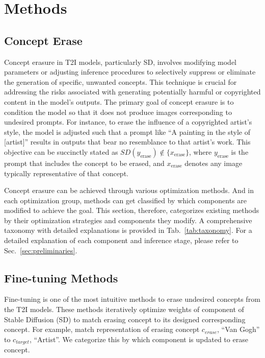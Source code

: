 \section{Methods} \label{sec:method}

\subsection{Concept Erase}
Concept erasure in T2I models, particularly SD, involves modifying model parameters or adjusting inference procedures to selectively suppress or eliminate the generation of specific, unwanted concepts. This technique is crucial for addressing the risks associated with generating potentially harmful or copyrighted content in the model's outputs. The primary goal of concept erasure is to condition the model so that it does not produce images corresponding to undesired prompts. For instance, to erase the influence of a copyrighted artist's style, the model is adjusted such that a prompt like ``A painting in the style of [artist]'' results in outputs that bear no resemblance to that artist's work. This objective can be succinctly stated as \(SD(y_{\text{erase}}) \not\in  \{ x_{\text{erase}}\}\), where \(y_{\text{erase}}\) is the prompt that includes the concept to be erased, and \(x_{\text{erase}}\) denotes any image typically representative of that concept.



Concept erasure can be achieved through various optimization methods. And in each optimization group, methods can get classified by which components are modified to achieve the goal. This section,  therefore, categorizes existing methods by their optimization strategies and components they modify.
A comprehensive taxonomy with detailed explanations is provided in Tab.~\ref{tab:taxonomy}.
For a detailed explanation of each component and inference stage, please refer to Sec.~\ref{sec:preliminaries}.


\subsection{Fine-tuning Methods} \label{subsec:finetuning}
Fine-tuning is one of the most intuitive methods to erase undesired concepts from the T2I models. These methods iteratively optimize weights of component of Stable Diffusion (SD) to match erasing concept to its designed corresponding concept. For example, match representation of erasing concept $c_{erase}$, ``Van Gogh'' to $c_{target}$, ``Artist''. We categorize this by which component is updated to erase concept. 

